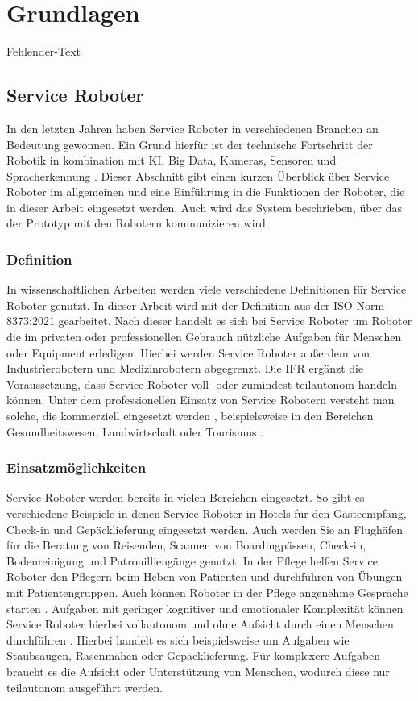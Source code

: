 \newpage
\section{Grundlagen} \label{Grundlagen}
Fehlender-Text

\subsection{Service Roboter}
In den letzten Jahren haben Service Roboter in verschiedenen Branchen an Bedeutung gewonnen. Ein Grund hierfür ist der technische Fortschritt der Robotik in kombination mit KI, Big Data, Kameras, Sensoren und Spracherkennung \cite[S.~424]{Paluch2020}. Dieser Abschnitt gibt einen kurzen Überblick über Service Roboter im allgemeinen und eine Einführung in die Funktionen der Roboter, die in dieser Arbeit eingesetzt werden. Auch wird das System beschrieben, über das der Prototyp mit den Robotern kommunizieren wird.

\subsubsection{Definition}
In wissenschaftlichen Arbeiten werden viele verschiedene Definitionen für Service Roboter genutzt. In dieser Arbeit wird mit der Definition aus der ISO Norm 8373:2021 \cite[Kap.~3]{ISO2021} gearbeitet. Nach dieser handelt es sich bei Service Roboter um Roboter die im privaten oder professionellen Gebrauch nützliche Aufgaben für Menschen oder Equipment erledigen. Hierbei werden Service Roboter außerdem von Industrierobotern und Medizinrobotern abgegrenzt. Die \ac{IFR} \cite{IFR2024} ergänzt die Voraussetzung, dass Service Roboter voll- oder zumindest teilautonom handeln können. Unter dem professionellen Einsatz von Service Robotern versteht man solche, die kommerziell eingesetzt werden \cite[S.~4]{GonzalezAguirre2021}, beispielsweise in den Bereichen Gesundheitswesen, Landwirtschaft oder Tourismus \cite[S.~9]{GonzalezAguirre2021}.

\subsubsection{Einsatzmöglichkeiten}
Service Roboter werden bereits in vielen Bereichen eingesetzt. So gibt es verschiedene Beispiele in denen Service Roboter in Hotels für den Gästeempfang, Check-in und Gepäcklieferung eingesetzt werden. Auch werden Sie an Flughäfen für die Beratung von Reisenden, Scannen von Boardingpässen, Check-in, Bodenreinigung und Patrouilliengänge genutzt. In der Pflege helfen Service Roboter den Pflegern beim Heben von Patienten und durchführen von Übungen mit Patientengruppen. Auch können Roboter in der Pflege angenehme Gespräche starten \cite[S.~425-427]{Paluch2020}. Aufgaben mit geringer kognitiver und emotionaler Komplexität können Service Roboter hierbei vollautonom und ohne Aufsicht durch einen Menschen durchführen \cite[S.~429]{Paluch2020}. Hierbei handelt es sich beispielsweise um Aufgaben wie Staubsaugen, Rasenmähen oder Gepäcklieferung. Für komplexere Aufgaben braucht es die Aufsicht oder Unterstützung von Menschen, wodurch diese nur teilautonom ausgeführt werden.

